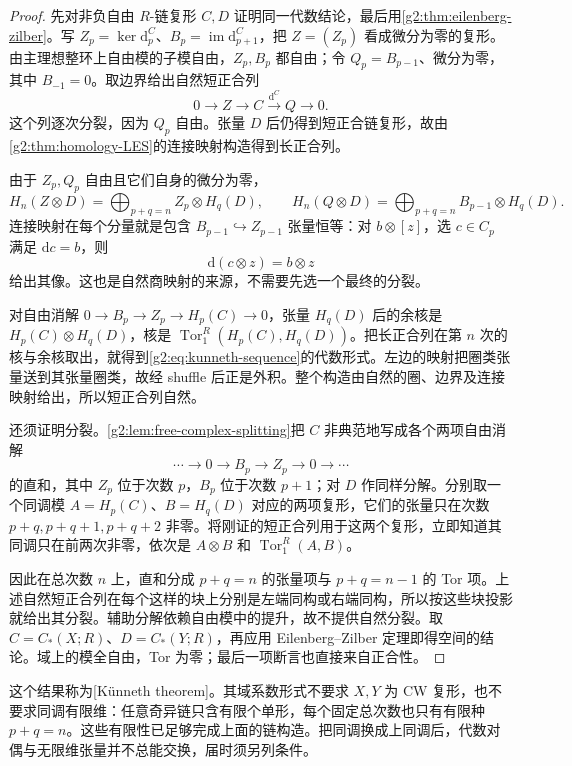 \begin{proof}
	先对非负自由 \(R\)-链复形 \(C,D\) 证明同一代数结论，最后用\cref{g2:thm:eilenberg-zilber}。写 \(Z_p=\ker\mathrm{d}_p^C\)、\(B_p=\operatorname{im}\mathrm{d}_{p+1}^C\)，把 \(Z=(Z_p)\) 看成微分为零的复形。由主理想整环上自由模的子模自由，\(Z_p,B_p\) 都自由；令 \(Q_p=B_{p-1}\)、微分为零，其中 \(B_{-1}=0\)。取边界给出自然短正合列
	\[
		0\longrightarrow Z\longrightarrow C
		\xrightarrow{\mathrm{d}^C}Q\longrightarrow0.
	\]
	这个列逐次分裂，因为 \(Q_p\) 自由。张量 \(D\) 后仍得到短正合链复形，故由\cref{g2:thm:homology-LES}的连接映射构造得到长正合列。

	由于 \(Z_p,Q_p\) 自由且它们自身的微分为零，
	\[
		H_n(Z\otimes D)=\bigoplus_{p+q=n}Z_p\otimes H_q(D),
		\qquad
		H_n(Q\otimes D)=\bigoplus_{p+q=n}B_{p-1}\otimes H_q(D).
	\]
	连接映射在每个分量就是包含 \(B_{p-1}\hookrightarrow Z_{p-1}\) 张量恒等：对 \(b\otimes[z]\)，选 \(c\in C_p\) 满足 \(\mathrm{d}c=b\)，则
	\[
		\mathrm{d}(c\otimes z)=b\otimes z
	\]
	给出其像。这也是自然商映射的来源，不需要先选一个最终的分裂。

	对自由消解 \(0\to B_p\to Z_p\to H_p(C)\to0\)，张量 \(H_q(D)\) 后的余核是 \(H_p(C)\otimes H_q(D)\)，核是 \(\operatorname{Tor}_1^R(H_p(C),H_q(D))\)。把长正合列在第 \(n\) 次的核与余核取出，就得到\eqref{g2:eq:kunneth-sequence}的代数形式。左边的映射把圈类张量送到其张量圈类，故经 shuffle 后正是外积。整个构造由自然的圈、边界及连接映射给出，所以短正合列自然。

	还须证明分裂。\cref{g2:lem:free-complex-splitting}把 \(C\) 非典范地写成各个两项自由消解
	\[
		\cdots\longrightarrow0\longrightarrow B_p
		\longrightarrow Z_p\longrightarrow0\longrightarrow\cdots
	\]
	的直和，其中 \(Z_p\) 位于次数 \(p\)，\(B_p\) 位于次数 \(p+1\)；对 \(D\) 作同样分解。分别取一个同调模 \(A=H_p(C)\)、\(B=H_q(D)\) 对应的两项复形，它们的张量只在次数 \(p+q,p+q+1,p+q+2\) 非零。将刚证的短正合列用于这两个复形，立即知道其同调只在前两次非零，依次是 \(A\otimes B\) 和 \(\operatorname{Tor}_1^R(A,B)\)。

	因此在总次数 \(n\) 上，直和分成 \(p+q=n\) 的张量项与 \(p+q=n-1\) 的 Tor 项。上述自然短正合列在每个这样的块上分别是左端同构或右端同构，所以按这些块投影就给出其分裂。辅助分解依赖自由模中的提升，故不提供自然分裂。取 \(C=C_*(X;R)\)、\(D=C_*(Y;R)\)，再应用 Eilenberg--Zilber 定理即得空间的结论。域上的模全自由，Tor 为零；最后一项断言也直接来自正合性。
\end{proof}

这个结果称为[Künneth theorem]。其域系数形式不要求 \(X,Y\) 为 CW 复形，也不要求同调有限维：任意奇异链只含有限个单形，每个固定总次数也只有有限种 \(p+q=n\)。这些有限性已足够完成上面的链构造。把同调换成上同调后，代数对偶与无限维张量并不总能交换，届时须另列条件。


